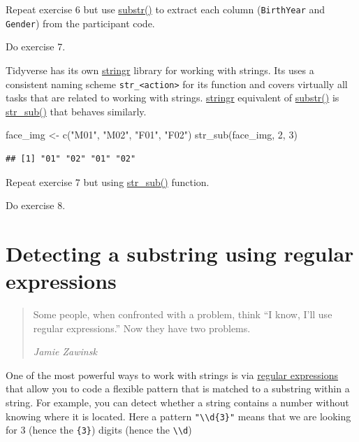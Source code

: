 \documentclass[
]{book}
\newenvironment{Shaded}{\begin{snugshade}}{\end{snugshade}}
\newcommand{\DecValTok}[1]{\textcolor[rgb]{0.00,0.00,0.81}{#1}}
\newcommand{\FunctionTok}[1]{\textcolor[rgb]{0.00,0.00,0.00}{#1}}
\newcommand{\NormalTok}[1]{#1}
\newcommand{\OtherTok}[1]{\textcolor[rgb]{0.56,0.35,0.01}{#1}}
\newcommand{\StringTok}[1]{\textcolor[rgb]{0.31,0.60,0.02}{#1}}
\begin{document}
Repeat exercise 6 but use \href{https://stat.ethz.ch/R-manual/R-patched/library/base/html/substr.html}{substr()} to extract each column (\texttt{BirthYear} and \texttt{Gender}) from the participant code.

Do exercise 7.

Tidyverse has its own \href{https://stringr.tidyverse.org/}{stringr} library for working with strings. Its uses a consistent naming scheme \texttt{str\_\textless{}action\textgreater{}} for its function and covers virtually all tasks that are related to working with strings. \href{https://stringr.tidyverse.org/}{stringr} equivalent of \href{https://stat.ethz.ch/R-manual/R-patched/library/base/html/substr.html}{substr()} is \href{https://stringr.tidyverse.org/reference/str_sub.html}{str\_sub()} that behaves similarly.

\begin{Shaded}
\begin{Highlighting}[]
\NormalTok{face\_img }\OtherTok{\textless{}{-}} \FunctionTok{c}\NormalTok{(}\StringTok{"M01"}\NormalTok{, }\StringTok{"M02"}\NormalTok{, }\StringTok{"F01"}\NormalTok{, }\StringTok{"F02"}\NormalTok{)}
\FunctionTok{str\_sub}\NormalTok{(face\_img, }\DecValTok{2}\NormalTok{, }\DecValTok{3}\NormalTok{)}
\end{Highlighting}
\end{Shaded}

\begin{verbatim}
## [1] "01" "02" "01" "02"
\end{verbatim}

Repeat exercise 7 but using \href{https://stringr.tidyverse.org/reference/str_sub.html}{str\_sub()} function.

Do exercise 8.

\hypertarget{detecting-a-substring-using-regular-expressions}{%
\section{Detecting a substring using regular expressions}\label{detecting-a-substring-using-regular-expressions}}

\begin{quote}
Some people, when confronted with a problem, think ``I know, I'll use regular expressions.'' Now they have two problems.

\emph{Jamie Zawinsk}
\end{quote}

One of the most powerful ways to work with strings is via \href{https://en.wikipedia.org/wiki/Regular_expression}{regular expressions} that allow you to code a flexible pattern that is matched to a substring within a string. For example, you can detect whether a string contains a number without knowing where it is located. Here a pattern \texttt{"\textbackslash{}\textbackslash{}d\{3\}"} means that we are looking for 3 (hence the \texttt{\{3\}}) digits (hence the \texttt{\textbackslash{}\textbackslash{}d})
\end{document}
